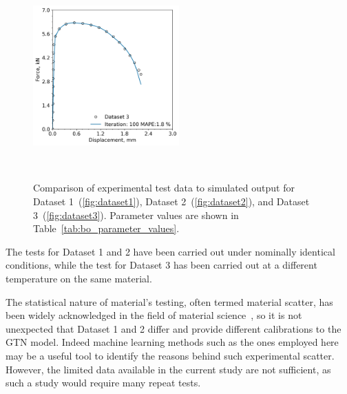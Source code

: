 \documentclass[preprint, review, 12pt]{elsarticle}
\begin{document}
\begin{figure}[!htbp]
\begin{minipage}[b]{0.5\linewidth}
			\label{fig:dataset2}
		\end{minipage}%
	\vspace{0.2cm}
		\begin{minipage}[b]{\linewidth}
			\centering
			\includegraphics[width=0.5\textwidth, height=0.45\textheight, keepaspectratio]{P91_500_FASTEST_ITERATION}
			\label{fig:dataset3}
		\end{minipage}~\caption{Comparison of experimental test data to simulated output for Dataset 1~(\ref{fig:dataset1}), Dataset 2~(\ref{fig:dataset2}), and Dataset 3~(\ref{fig:dataset3}). Parameter values are shown in Table~\ref{tab:bo_parameter_values}.}
	\label{fig:bo_result}
	\end{figure}


	

	The tests for Dataset 1 and 2 have been carried out under nominally identical conditions, while the test for Dataset 3 has been carried out at a different temperature on the same material.

	The statistical nature of material's testing, often termed material scatter, has been widely acknowledged in the field of material science~\cite{OCONNOR2022}, so it is not unexpected that Dataset 1 and 2 differ and provide different calibrations to the GTN model.
	Indeed machine learning methods such as the ones employed here may be a useful tool to identify the reasons behind such experimental scatter.
	However, the limited data available in the current study are not sufficient, as such a study would require many repeat tests.
\end{document}
